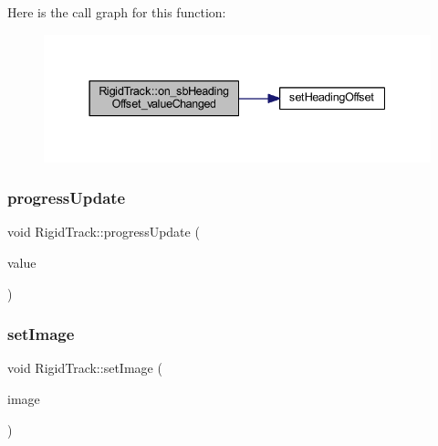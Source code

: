 Here is the call graph for this function\+:
\nopagebreak
\begin{figure}[H]
\begin{center}
\leavevmode
\includegraphics[width=337pt]{class_rigid_track_a72e338d6bf93d0efa3bc503f7ca736c5_cgraph}
\end{center}
\end{figure}
\mbox{\label{class_rigid_track_a9d229d23fdf40b988a1743accb695ea8}} 
\subsubsection{\texorpdfstring{progress\+Update}{progressUpdate}}
{\footnotesize\ttfamily void Rigid\+Track\+::progress\+Update (\begin{DoxyParamCaption}\item[{int}]{value }\end{DoxyParamCaption})\hspace{0.3cm}{\ttfamily [slot]}}

\mbox{\label{class_rigid_track_a3b0b3835204cad40abdb144d24aefc76}} 
\subsubsection{\texorpdfstring{set\+Image}{setImage}}
{\footnotesize\ttfamily void Rigid\+Track\+::set\+Image (\begin{DoxyParamCaption}\item[{Q\+Pixmap}]{image }\end{DoxyParamCaption})\hspace{0.3cm}{\ttfamily [slot]}}

\mbox{\label{class_rigid_track_a54a029af74a21f92749e99df7ed847b2}} 
